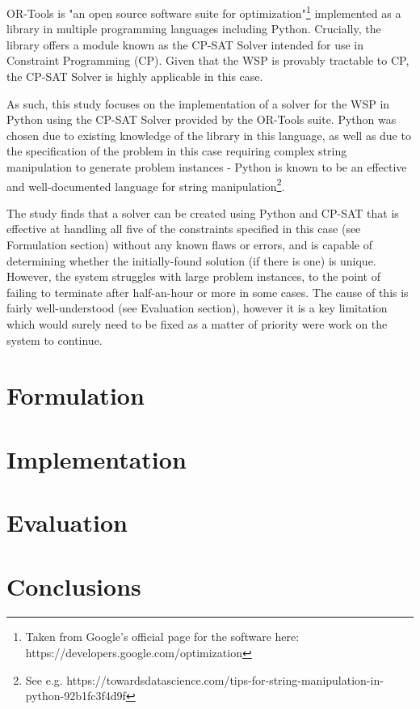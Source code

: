 \documentclass[11pt]{article}
\begin{document}
		OR-Tools is "an open source software suite for optimization"\footnote{Taken from Google's official page for the software here: https://developers.google.com/optimization}
		implemented as a library in multiple programming languages including Python.
		Crucially, the library offers a module known as the CP-SAT Solver intended for
		use in Constraint Programming (CP). Given that the WSP is provably tractable to
		CP\cite{benoist02}, the CP-SAT Solver is highly applicable in this case.

		As such, this study focuses on the implementation of a solver for the WSP
		in Python using the CP-SAT Solver provided by the OR-Tools suite. Python
		was chosen due to existing knowledge of the library in this language,
		as well as due to the specification of the problem in this case requiring
		complex string manipulation to generate problem instances - Python is
		known to be an effective and well-documented language for string
		manipulation\footnote{See e.g. https://towardsdatascience.com/tips-for-string-manipulation-in-python-92b1fc3f4d9f}.

		The study finds that a solver can be created using Python and CP-SAT that
		is effective at handling all five of the constraints specified in this case (see Formulation section)
		without any known flaws or errors, and is capable of determining whether
		the initially-found solution (if there is one) is unique. However, the
		system struggles with large problem instances, to the point of failing to
		terminate after half-an-hour or more in some cases. The cause of this is
		fairly well-understood (see Evaluation section), however it is a key limitation
		which would surely need to be fixed as a matter of priority were work on
		the system to continue.

	\section{Formulation}

	\section{Implementation}

	\section{Evaluation}

	\section{Conclusions}
\end{document}
